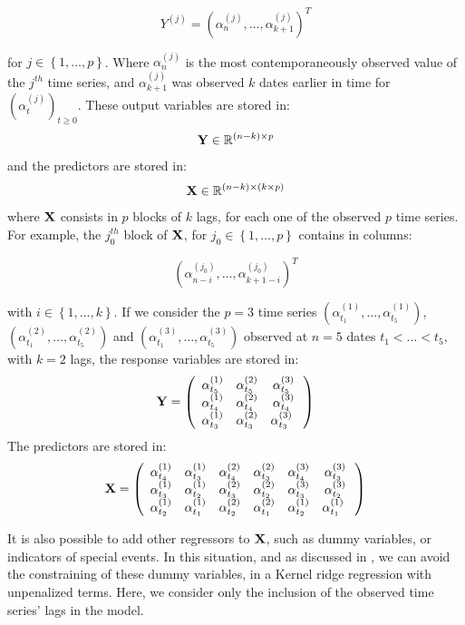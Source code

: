 \begin{equation}
Y^{(j)} = \left(\alpha^{(j)}_n, \ldots, \alpha^{(j)}_{k+1} \right)^T
\end{equation}

for $j \in \left\lbrace 1, \ldots,
p \right\rbrace$. Where $\alpha^{(j)}_n$ is the most contemporaneously observed value
of the $j^{th}$ time series, and $\alpha^{(j)}_{k+1}$ was observed $k$ dates earlier
in time for $(\alpha^{(j)}_t)_{t \geq 0}$. These output variables are stored in: $$ {\bf Y} \in \mathbb{R}^{(n-k) \times p} $$ and the predictors are
stored in: $$ {\bf X} \in \mathbb{R}^{(n-k) \times (k \times p)} $$
where ${\bf X}$ consists in $p$ blocks of $k$ lags, for each one of the observed
$p$ time series. For example, the $j_0^{th}$ block of ${\bf X}$, for $j_0 \in
\left\lbrace 1, \ldots, p \right\rbrace$  contains in columns:

\begin{equation}
\left( \alpha^{(j_0)}_{n-i}, \ldots, \alpha^{(j_0)}_{k+1-i} \right)^T
\end{equation}

with $i \in
\left\lbrace 1, \ldots, k \right\rbrace$. If we consider the $p = 3$ time series $(\alpha^{(1)}_{t_1}, \ldots,  \alpha^{(1)}_{t_5})$, $(\alpha^{(2)}_{t_1}, \ldots,  \alpha^{(2)}_{t_5})$ and $(\alpha^{(3)}_{t_1}, \ldots,  \alpha^{(3)}_{t_5})$ observed at $n = 5$ dates $t_1 < \ldots < t_5$, with $k = 2$ lags,  the response variables are stored in:
$$
{\bf Y} = \left( {\begin{array}{ccc} \alpha^{(1)}_{t_5} &  \alpha^{(2)}_{t_5} &  \alpha^{(3)}_{t_5}\\ \alpha^{(1)}_{t_4} & \alpha^{(2)}_{t_4} & \alpha^{(3)}_{t_4} \\ \alpha^{(1)}_{t_3} & \alpha^{(2)}_{t_3} & \alpha^{(3)}_{t_3}\      \end{array} } \right)
$$
The predictors are stored in:
$$
{\bf X} = \left( {\begin{array}{cccccc} \alpha^{(1)}_{t_4} & \alpha^{(1)}_{t_3} & \alpha^{(2)}_{t_4} & \alpha^{(2)}_{t_3} & \alpha^{(3)}_{t_4} & \alpha^{(3)}_{t_3} \\ \alpha^{(1)}_{t_3} & \alpha^{(1)}_{t_2} & \alpha^{(2)}_{t_3} & \alpha^{(2)}_{t_2} & \alpha^{(3)}_{t_3} & \alpha^{(3)}_{t_2} \\ \alpha^{(1)}_{t_2} & \alpha^{(1)}_{t_1} & \alpha^{(2)}_{t_2} & \alpha^{(2)}_{t_1} & \alpha^{(1)}_{t_2} & \alpha^{(1)}_{t_1} \      \end{array} }\right)
$$


It is also possible to add other regressors to ${\bf X}$, such as dummy variables, or indicators of special events. In this situation, and as discussed in \cite{exterkate2016nonlinear}, we can avoid the constraining of these dummy variables, in a Kernel ridge regression with unpenalized terms. Here, we consider only the inclusion of the observed time series' lags in the model.

